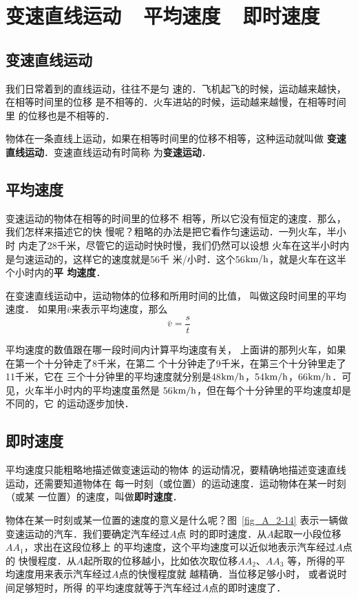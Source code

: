 \section{变速直线运动~~平均速度~~即时速度}
    \subsection{变速直线运动}
    
    我们日常着到的直线运动，往往不是匀
速的．飞机起飞的时候，运动越来越快，在相等时间里的位移
是不相等的．火车进站的时候，运动越来越慢，在相等时间里
的位移也是不相等的．

物体在一条直线上运动，如果在相等时间里的位移不相等，这种运动就叫做
\textbf{变速直线运动}．变速直线运动有时简称
为\textbf{变速运动}．

\subsection{平均速度}

变速运动的物体在相等的时间里的位移不
相等，所以它没有恒定的速度．那么，我们怎样来描述它的快
慢呢？粗略的办法是把它看作匀速运动．一列火车，半小时
内走了28千米，尽管它的运动时快时慢，我们仍然可以设想
火车在这半小时内是匀速运动的，这样它的速度就是56千
米/小时．这个56$\text{km}/\text{h}$，就是火车在这半个小时内的\textbf{平
均速度}．

在变速直线运动中，运动物体的位移和所用时间的比值，
叫做这段时间里的平均速度．
如果用$\bar v$来表示平均速度，那么
\[\bar v=\frac{s}{t}\]

平均速度的数值跟在哪一段时间内计算平均速度有关，
上面讲的那列火车，如果在第一个十分钟走了8千米，在第二
个十分钟走了9千米，在第三个十分钟里走了11千米，它在
三个十分钟里的平均速度就分别是48$\text{km}/\text{h}$，54$\text{km}/\text{h}$，66$\text{km}/\text{h}$．可见，火车半小时内的平均速度虽然是
56$\text{km}/\text{h}$，但在每个十分钟里的平均速度却是不同的，它
的运动逐步加快．

\subsection{即时速度}
平均速度只能粗略地描述做变速运动的物体
的运动情况，要精确地描述变速直线运动，还需要知道物体在
每一时刻（或位置）的运动速度．运动物体在某一时刻（或某
一位置）的速度，叫做\textbf{即时速度}．

物体在某一时刻或某一位置的速度的意义是什么呢？图~\ref{fig_A_2-14} 
表示一辆做变速运动的汽车．我们要确定汽车经过$A$点
时的即时速度．从$A$起取一小段位移$AA_1$，求出在这段位移上
的平均速度，这个平均速度可以近似地表示汽车经过$A$点的
快慢程度．从$A$起所取的位移越小，比如依次取位移$AA_2$、$AA_3$
等，所得的平均速度用来表示汽车经过$A$点的快慢程度就
越精确．当位移足够小时，
或者说时间足够短时，所得
的平均速度就等于汽车经过$A$点的即时速度了．

